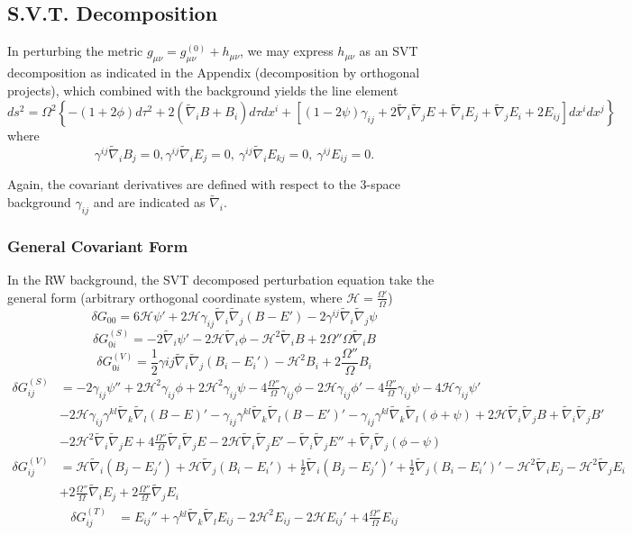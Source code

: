 \documentclass[10pt,letterpaper]{article}
\newcommand{\clr}[1]{\left\{#1\right\}} %
\newcommand{\blr}[1]{\left[#1\right]} %
\newcommand{\be}{\begin{equation}} %
\newcommand{\ee}{\end{equation}} %
\newcommand{\del}{\nabla} %
\newcommand{\hu}{\mathcal H}
\numberwithin{equation}{section}
\begin{document}
\subsection{S.V.T. Decomposition}
In perturbing the metric $g_{\mu\nu} = g^{(0)}_{\mu\nu} + h_{\mu\nu}$, we may express $h_{\mu\nu}$ as an SVT decomposition as indicated in the Appendix (decomposition by orthogonal projects), which combined with the background yields the line element
\be
	ds^2 = \Omega^2 \clr{ -(1+2\phi) d\tau^2 + 2(\tilde\del_i B + B_i)d\tau dx^i + \blr{ (1-2\psi)\gamma_{ij} + 2\tilde\del_i\tilde\del_j E + \tilde\del_i E_j + \tilde\del_j E_i + 2E_{ij}}dx^i dx^j}
\ee
where
\be
	\gamma^{ij}\tilde\del_i B_j = 0,\gamma^{ij}\tilde\del_i E_j = 0,\ \gamma^{ij}\tilde\del_i E_{kj} = 0,\ \gamma^{ij}E_{ij} = 0.
\ee

Again, the covariant derivatives are defined with respect to the 3-space background $\gamma_{ij}$ and are indicated as $\tilde \del_i$.
\subsubsection{General Covariant Form}
In the RW background, the SVT decomposed perturbation equation take the general form (arbitrary orthogonal coordinate system, where $\hu = \tfrac{\Omega'}{\Omega}$)
\be
	\delta G_{00} = 6\hu \psi' + 2\hu \gamma_{ij}\tilde\del_i\tilde\del_j (B- E') - 2\gamma^{ij}\tilde\del_i\tilde\del_j \psi
\ee
\be
	\delta G^{(S)}_{0i} = -2\tilde\del_i  \psi' - 2\hu \tilde\del_i \phi - \hu^2 \tilde\del_i B + 2 { \Omega''}{\Omega}\tilde\del_i B
\ee
\be
	\delta G^{(V)}_{0i} = \frac12 \gamma{ij}\tilde\del_i\tilde\del_j (B_i-E_i') - \hu^2 B_i + 2\frac{ \Omega''}{\Omega} B_i
\ee
\begin{align}
	\delta G^{(S)}_{ij} &= -2 \gamma_{ij}  \psi'' + 2\hu^2 \gamma_{ij} \phi + 2\hu^2 \gamma_{ij}\psi - 4\frac{\Omega''}{\Omega}\gamma_{ij}\phi - 2\hu \gamma_{ij}\phi' -4\frac{\Omega''}{\Omega}\gamma_{ij}\psi - 4\hu \gamma_{ij} \psi' \\
&- 2\hu \gamma_{ij} \gamma^{kl}\tilde\del_k\tilde\del_l (B- E)' - \gamma_{ij}\gamma^{kl}\tilde\del_k\tilde\del_l ( B- E')' - \gamma_{ij}\gamma^{kl}\tilde\del_k\tilde\del_l (\phi+\psi) + 2\hu\tilde\del_i\tilde\del_j B + \tilde\del_i\tilde\del_j  B' \nonumber \\
&- 2\hu^2 \tilde\del_i \tilde\del_j E + 4\frac{\Omega''}{\Omega}\tilde\del_i\tilde\del_j E - 2\hu \tilde\del_i\tilde\del_j E' - \tilde\del_i\tilde\del_j E'' +\tilde\del_i\tilde\del_j(\phi-\psi) \nonumber
\end{align}
\begin{align}
	\delta G^{(V)}_{ij} &= \hu\tilde\del_i(B_j- E_j') + \hu \tilde\del_j(B_i- E_i') + \frac12 \tilde\del_i ( B_j -  E_j')' + \frac12 \tilde\del_j ( B_i -  E_i')'- \hu^2 \tilde\del_i E_j -\hu^2 \tilde\del_j E_i \\
&+ 2\frac{\Omega''}{\Omega}\tilde\del_i E_j + 2\frac{\Omega''}{\Omega}\tilde\del_j E_i \nonumber
\end{align}
\begin{align}
	\delta G^{(T)}_{ij} &=  E_{ij}'' + \gamma^{kl}\tilde\del_k\tilde\del_l E_{ij} - 2 \hu^2 E_{ij} -2 \hu E_{ij}' + 4 \frac{\Omega''}{\Omega}E_{ij}
\end{align}
\end{document}
